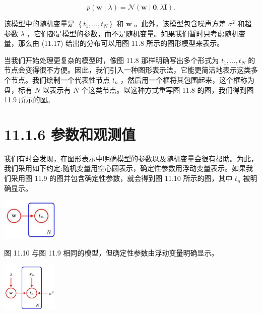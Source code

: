 \documentclass[10pt]{article}
\begin{document}
\[
p\left( {\mathbf{w} \mid  \lambda }\right)  = \mathcal{N}\left( {\mathbf{w} \mid  \mathbf{0},\lambda \mathbf{I}}\right) . \tag{11.18}
\]

该模型中的随机变量是 \(\left\{  {{t}_{1},\ldots ,{t}_{N}}\right\}\) 和 \(\mathbf{w}\) 。此外，该模型包含噪声方差 \({\sigma }^{2}\) 和超参数 \(\lambda\) ，它们都是模型的参数，而不是随机变量。如果我们暂时只考虑随机变量，那么由 (11.17) 给出的分布可以用图 11.8 所示的图形模型来表示。

当我们开始处理更复杂的模型时，像图 11.8 那样明确写出多个形式为 \({t}_{1},\ldots ,{t}_{N}\) 的节点会变得很不方便。因此，我们引入一种图形表示法，它能更简洁地表示这类多个节点。我们绘制一个代表性节点 \({t}_{n}\) ，然后用一个框将其包围起来，这个框称为盘，标有 \(N\) 以表示有 \(N\) 个这类节点。以这种方式重写图 11.8 的图，我们得到图 11.9 所示的图。

\section*{11.1.6 参数和观测值}

我们有时会发现，在图形表示中明确模型的参数以及随机变量会很有帮助。为此，我们采用如下约定:随机变量用空心圆表示，确定性参数用浮动变量表示。如果我们采用图 11.9 的图并包含确定性参数，就会得到图 11.10 所示的图，其中 \({t}_{n}\) 被明确显示。

\begin{center}
\includegraphics[max width=0.2\textwidth]{images/0194e279-9b28-703a-88f4-c3ac21e2010d_353_1306_1801_242_182_0.jpg}
\end{center}
\hspace*{3em} 

图 11.10 与图 11.9 相同的模型，但确定性参数由浮动变量明确显示。

\begin{center}
\includegraphics[max width=0.2\textwidth]{images/0194e279-9b28-703a-88f4-c3ac21e2010d_354_1223_344_318_284_0.jpg}
\end{center}
\hspace*{3em} 
\end{document}
